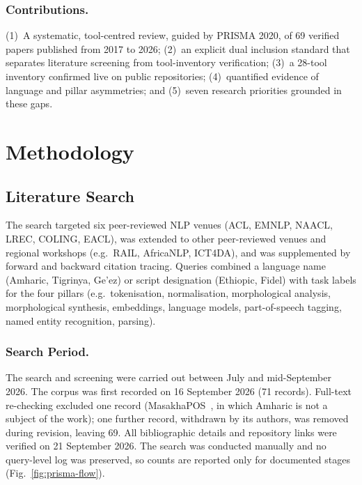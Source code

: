 \documentclass[runningheads]{llncs}
\begin{document}
\subsubsection{Contributions.} (1)~A systematic, tool-centred review, guided by PRISMA 2020, of 69 verified papers published from 2017 to 2026; (2)~an explicit dual inclusion standard that separates literature screening from tool-inventory verification; (3)~a 28-tool inventory confirmed live on public repositories; (4)~quantified evidence of language and pillar asymmetries; and (5)~seven research priorities grounded in these gaps.

\section{Methodology}\label{sec:methodology}

\subsection{Literature Search}\label{sec:literature-search}

The search targeted six peer-reviewed NLP venues (ACL, EMNLP, NAACL, LREC, COLING, EACL), was extended to other peer-reviewed venues and regional workshops (e.g.\ RAIL, AfricaNLP, ICT4DA), and was supplemented by forward and backward citation tracing. Queries combined a language name (Amharic, Tigrinya, Ge'ez) or script designation (Ethiopic, Fidel) with task labels for the four pillars (e.g.\ tokenisation, normalisation, morphological analysis, morphological synthesis, embeddings, language models, part-of-speech tagging, named entity recognition, parsing).

\subsubsection{Search Period.} The search and screening were carried out between July and mid-September 2026. The corpus was first recorded on 16 September 2026 (71 records). Full-text re-checking excluded one record (MasakhaPOS~\cite{dione_masakhapos_2023}, in which Amharic is not a subject of the work); one further record, withdrawn by its authors, was removed during revision, leaving 69. All bibliographic details and repository links were verified on 21 September 2026. The search was conducted manually and no query-level log was preserved, so counts are reported only for documented stages (Fig.~\ref{fig:prisma-flow}).
\end{document}
